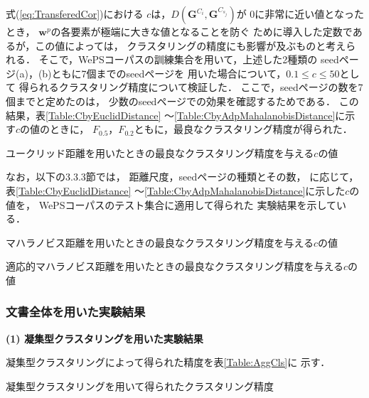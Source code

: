 \documentclass[japanese]{jnlp_1.4}
\begin{document}
式(\ref{eq:TransferedCor})における
$c$は，$D(\boldsymbol{G}^{C_{i}}, \boldsymbol{G}^{C_{s_{j}}})$が
0に非常に近い値となったとき，
$\boldsymbol{w}^{p}$の各要素が極端に大きな値となることを防ぐ
ために導入した定数であるが，この値によっては，
クラスタリングの精度にも影響が及ぶものと考えられる．
そこで，WePSコーパスの訓練集合を用いて，上述した2種類の
seedページ(a)，(b)ともに7個までのseedページを
用いた場合について，$0.1\le c\le 50$として
得られるクラスタリング精度について検証した．
ここで，seedページの数を7個までと定めたのは，
少数のseedページでの効果を確認するためである．
この結果，表\ref{Table:CbyEuclidDistance}
〜\ref{Table:CbyAdpMahalanobisDistance}に示す$c$の値のときに，
$F_{0.5}$，$F_{0.2}$ともに，最良なクラスタリング精度が得られた．

\begin{table}[b]
 \caption{ユークリッド距離を用いたときの最良なクラスタリング精度を与える$c$の値}
 \label{Table:CbyEuclidDistance}

\end{table}


なお，以下の3.3.3節では，
距離尺度，seedページの種類とその数，
に応じて，表\ref{Table:CbyEuclidDistance}
〜\ref{Table:CbyAdpMahalanobisDistance}に示した$c$の値を，
WePSコーパスのテスト集合に適用して得られた
実験結果を示している．


\begin{table}[t]
 \caption{マハラノビス距離を用いたときの最良なクラスタリング精度を与える$c$の値}
 \label{Table:CbyMahalanobisDistance}

\end{table}
\begin{table}[t]
 \caption{適応的マハラノビス距離を用いたときの最良なクラスタリング精度を与える$c$の値}
 \label{Table:CbyAdpMahalanobisDistance}

\end{table}


\subsubsection{文書全体を用いた実験結果}

\noindent
\textbf{(1) 凝集型クラスタリングを用いた実験結果}

凝集型クラスタリングによって得られた精度を表\ref{Table:AggCls}に
示す．


\begin{table}[t]
 \caption{凝集型クラスタリングを用いて得られたクラスタリング精度}
 \label{Table:AggCls}

\end{table}
\end{document}
